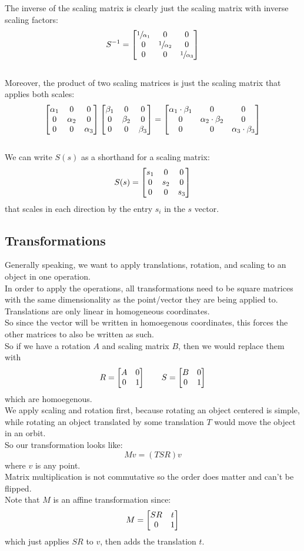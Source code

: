 \documentclass[12pt]{article}
\begin{document}
The inverse of the scaling matrix
is clearly just the scaling matrix
with inverse scaling factors:
\[ S^{-1} = \begin{bmatrix} \sfrac{1}{\alpha_1} & 0 & 0 \\ 0 & \sfrac{1}{\alpha_2} & 0 \\ 0 & 0 & \sfrac{1}{\alpha_3} \end{bmatrix} \] \\

Moreover, the product of two scaling
matrices is just the scaling matrix
that applies both scales:
\[ \begin{bmatrix} \alpha_1 & 0 & 0 \\ 0 & \alpha_2 & 0 \\ 0 & 0 & \alpha_3 \end{bmatrix}
\begin{bmatrix} \beta_1 & 0 & 0 \\ 0 & \beta_2 & 0 \\ 0 & 0 & \beta_3 \end{bmatrix}
= \begin{bmatrix} \alpha_1 \cdot \beta_1 & 0 & 0 \\ 0 & \alpha_2 \cdot \beta_2 & 0 \\ 0 & 0 & \alpha_3 \cdot \beta_3 \end{bmatrix} \] \\

We can write $S(s)$
as a shorthand for a scaling matrix:
\[ S(s) = \begin{bmatrix} s_1 & 0 & 0 \\ 0 & s_2 & 0 \\ 0 & 0 & s_3 \end{bmatrix} \]
that scales in each direction by 
the entry $s_i$ in the $s$ vector. \\

\newpage

\subsection*{Transformations}

Generally speaking, we want to apply
translations, rotation, and scaling to an object
in one operation. \\

In order to apply the operations, all transformations
need to be square matrices with the same dimensionality
as the point/vector they are being applied to. \\
Translations are only linear in homogeneous coordinates. \\
So since the vector will be written in homoegenous
coordinates,
this forces the other matrices to also be written as such. \\
So if we have a rotation $A$ and scaling matrix $B$,
then we would replace them with
\[ R = \begin{bmatrix} A & 0 \\ 0 & 1 \end{bmatrix}
\qquad S = \begin{bmatrix} B & 0 \\ 0 & 1 \end{bmatrix} \]
which are homoegenous. \\

We apply scaling and rotation first,
because rotating an object centered is simple,
while rotating an object translated by some 
translation $T$ would move the object in an orbit. \\
So our transformation looks like:
\[ Mv = (TSR)v \]
where $v$ is any point. \\
Matrix multiplication is not commutative so
the order does matter and can't be flipped. \\
Note that $M$ is an affine transformation since:
\[ M = \begin{bmatrix} SR & t \\ 0 & 1 \end{bmatrix} \]
which just applies $SR$ to $v$,
then adds the translation $t$. \\
\end{document}
